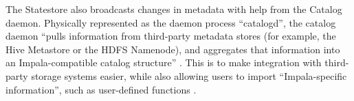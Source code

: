\documentclass[onecolumn, draftclsnofoot,10pt, compsoc]{IEEEtran}
\begin{document}
\indent The Statestore also broadcasts changes in metadata with help from the Catalog daemon. Physically represented as the daemon process “catalogd”, the catalog daemon “pulls information from third-party metadata stores (for example, the Hive Metastore or the HDFS Namenode), and aggregates that information into an Impala-compatible catalog structure” \cite{Impala}. This is to make integration with third-party storage systems easier, while also allowing users to import “Impala-specific information”, such as user-defined functions \cite{Impala}. \\
	
\nocite{*}


\end{document}

